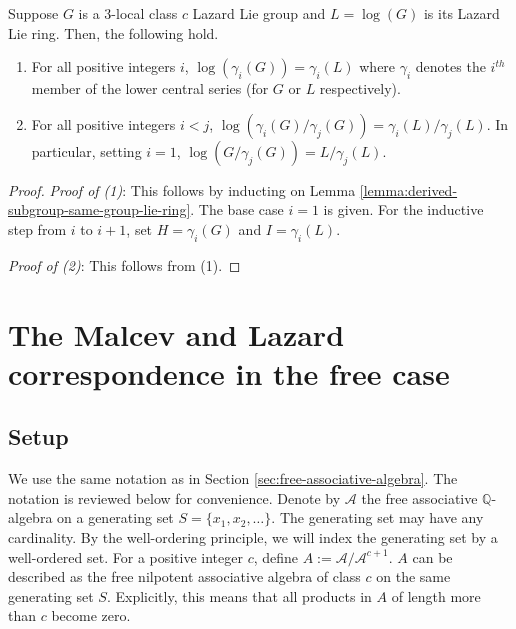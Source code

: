 \documentclass{ucetd}
\begin{document}
\begin{theorem}\label{thm:lazard-correspondence-lcs}
  Suppose $G$ is a $3$-local class $c$ Lazard Lie group and $L =
  \log(G)$ is its Lazard Lie ring. Then, the following hold.

  \begin{enumerate}
  \item For all positive integers $i$, $\log(\gamma_i(G)) =
    \gamma_i(L)$ where $\gamma_i$ denotes the $i^{th}$ member of the
    lower central series (for $G$ or $L$ respectively).
  \item For all positive integers $i < j$,
    $\log(\gamma_i(G)/\gamma_j(G)) = \gamma_i(L)/\gamma_j(L)$. In
    particular, setting $i = 1$, $\log(G/\gamma_j(G)) =
    L/\gamma_j(L)$.
  \end{enumerate}
\end{theorem}

\begin{proof}
  {\em Proof of (1)}: This follows by inducting on Lemma
  \ref{lemma:derived-subgroup-same-group-lie-ring}. The base case $i =
  1$ is given. For the inductive step from $i$ to $i + 1$, set $H =
  \gamma_i(G)$ and $I = \gamma_i(L)$.

  {\em Proof of (2)}: This follows from (1).
\end{proof}

\section{The Malcev and Lazard correspondence in the free case}\label{sec:malcev-lazard-free}

\subsection{Setup}\label{sec:malcev-lazard-free-setup}

We use the same notation as in Section
\ref{sec:free-associative-algebra}. The notation is reviewed below for
convenience. Denote by $\mathcal{A}$ the free associative
$\mathbb{Q}$-algebra on a generating set $S = \{ x_1,x_2,\dots
\}$. The generating set may have any cardinality. By the well-ordering
principle, we will index the generating set by a well-ordered set. For
a positive integer $c$, define $A :=
\mathcal{A}/\mathcal{A}^{c+1}$. $A$ can be described as the free
nilpotent associative algebra of class $c$ on the same generating set
$S$. Explicitly, this means that all products in $A$ of length more
than $c$ become zero.
\end{document}

